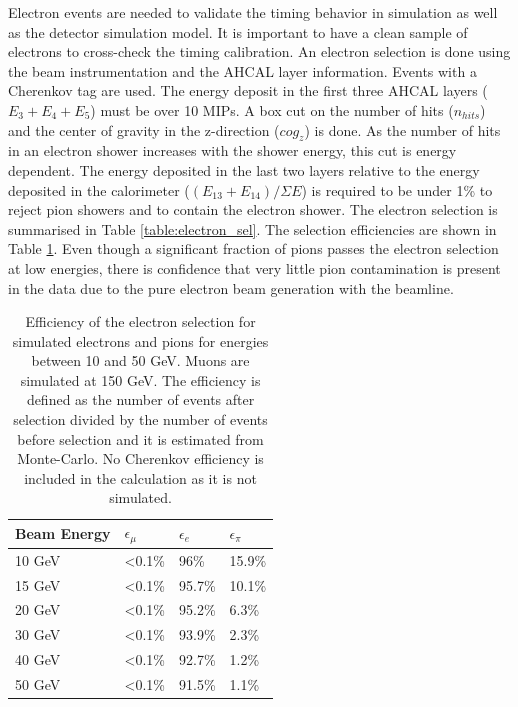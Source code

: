 \documentclass{JINST}
\begin{document}
Electron events are needed to validate the timing behavior in simulation as well as the detector simulation model. It is important to have a clean sample of electrons to cross-check the timing calibration. An electron selection is done using the beam instrumentation and the AHCAL layer information. Events with a Cherenkov tag are used. The energy deposit in the first three AHCAL layers ($E_3+E_4+E_5$) must be over 10 MIPs. A box cut on the number of hits ($n_{hits}$) and the center of gravity in the z-direction ($cog_{z}$) is done. As the number of hits in an electron shower increases with the shower energy, this cut is energy dependent. The energy deposited in the last two layers relative to the energy deposited in the calorimeter ($(E_{13}+E_{14})/\Sigma E$) is required to be under 1\% to reject pion showers and to contain the electron shower. The electron selection is summarised in Table \ref{table:electron_sel}. The selection efficiencies are shown in Table \ref{table:eff_electron}. Even though a significant fraction of pions passes the electron selection at low energies, there is confidence that very little pion contamination is present in the data due to the pure electron beam generation with the beamline.

\begin{table}[htb!]
	\centering
	\caption{Efficiency of the electron selection for simulated electrons and pions for energies between 10 and 50 GeV. Muons are simulated at 150 GeV. The efficiency is defined as the number of events after selection divided by the number of events before selection and it is estimated from Monte-Carlo. No Cherenkov efficiency is included in the calculation as it is not simulated.}
	\label{table:eff_electron}
	\begin{tabular}{@{} llll @{}}
		\toprule
		\textbf{Beam Energy} & \textbf{$\epsilon_{\mu}$} & \textbf{$\epsilon_{e}$} & \textbf{$\epsilon_{\pi}$}\\
		\midrule
		10 GeV & <0.1\% & 96\% & 15.9\%\\
		15 GeV & <0.1\% & 95.7\% & 10.1\%\\
		20 GeV & <0.1\% & 95.2\% & 6.3\%\\
		30 GeV & <0.1\% & 93.9\% & 2.3\%\\
		40 GeV & <0.1\% & 92.7\% & 1.2\%\\
		50 GeV & <0.1\% & 91.5\% & 1.1\%\\
		\bottomrule
	\end{tabular}
\end{table}
\end{document}
